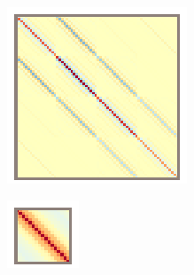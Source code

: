\begin{figure}
\begin{subfigure}{\textwidth/4}
      \caption{}
    \end{subfigure}\hfill%
    \begin{subfigure}{\textwidth/4}
		  \includegraphics[width=\linewidth]{figures/stbf_struct/covs-5.eps}
      \caption{}
    \end{subfigure}\hfill%
    \begin{minipage}[b]{\textwidth/10}
      \begin{subfigure}{\textwidth}
  		  \includegraphics[width=\linewidth]{figures/stbf_struct/covs-8.eps}

\end{subfigure}
\end{minipage}
\end{figure}
